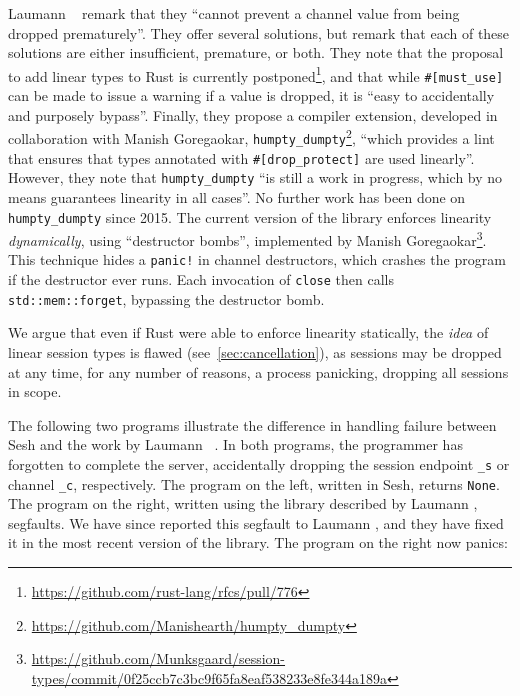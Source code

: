 \documentclass[copyright,creativecommons]{eptcs}
\begin{document}
Laumann \etal~\cite{jespersen2015} remark that they ``cannot prevent a channel value from being dropped prematurely''. They offer several solutions, but remark that each of these solutions are either insufficient, premature, or both. They note that the proposal to add linear types to Rust is currently postponed\footnote{\url{https://github.com/rust-lang/rfcs/pull/776}}, and that while \lstinline{#[must_use]} can be made to issue a warning if a value is dropped, it is ``easy to accidentally and purposely bypass''. Finally, they propose a compiler extension, developed in collaboration with Manish Goregaokar, \lstinline{humpty_dumpty}\footnote{\url{https://github.com/Manishearth/humpty_dumpty}}, ``which provides a lint that ensures that types annotated  with \lstinline{#[drop_protect]} are used linearly''. However, they note that \lstinline{humpty_dumpty} ``is still a work in progress, which by no means guarantees linearity in all cases''. No further work has been done on \lstinline{humpty_dumpty} since 2015. The current version of the library enforces linearity \emph{dynamically}, using ``destructor bombs'', implemented by Manish Goregaokar\footnote{\url{https://github.com/Munksgaard/session-types/commit/0f25ccb7c3bc9f65fa8eaf538233e8fe344a189a}}. This technique hides a \lstinline{panic!} in channel destructors, which crashes the program if the destructor ever runs. Each invocation of \lstinline{close} then calls \lstinline{std::mem::forget}, bypassing the destructor bomb.

We argue that even if Rust were able to enforce linearity statically, the \emph{idea} of linear session types is flawed (see~\cref{sec:cancellation}), as sessions may be dropped at any time, for any number of reasons, \eg a process panicking, dropping all sessions in scope.

The following two programs illustrate the difference in handling failure between Sesh and the work by Laumann \etal~\cite{jespersen2015}. In both programs, the programmer has forgotten to complete the server, accidentally dropping the session endpoint \lstinline{_s} or channel \lstinline{_c}, respectively. The program on the left, written in Sesh, returns \lstinline{None}. The program on the right, written using the library described by Laumann \etal\cite{jespersen2015}, segfaults. We have since reported this segfault to Laumann \etal, and they have fixed it in the most recent version of the library. The program on the right now panics:
\end{document}
